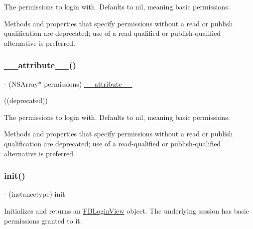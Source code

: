 The permissions to login with. Defaults to nil, meaning basic permissions.

Methods and properties that specify permissions without a read or publish qualification are deprecated; use of a read-\/qualified or publish-\/qualified alternative is preferred. \mbox{\label{interfaceFBLoginView_aed5ee6aec67e5fd04eed62c4ff09b9f4}} 
\subsubsection{\texorpdfstring{\+\_\+\+\_\+attribute\+\_\+\+\_\+()}{\_\_attribute\_\_()}\hspace{0.1cm}{\footnotesize\ttfamily [5/5]}}
{\footnotesize\ttfamily -\/ (N\+S\+Array$\ast$ permissions) \hyperlink{struct____attribute____}{\+\_\+\+\_\+attribute\+\_\+\+\_\+} \begin{DoxyParamCaption}\item[{((deprecated))}]{ }\end{DoxyParamCaption}}

The permissions to login with. Defaults to nil, meaning basic permissions.

Methods and properties that specify permissions without a read or publish qualification are deprecated; use of a read-\/qualified or publish-\/qualified alternative is preferred. \mbox{\label{interfaceFBLoginView_ae0dfdb97b6ddecbd42bb778b02d3f890}} 
\subsubsection{\texorpdfstring{init()}{init()}\hspace{0.1cm}{\footnotesize\ttfamily [1/5]}}
{\footnotesize\ttfamily -\/ (instancetype) init \begin{DoxyParamCaption}{ }\end{DoxyParamCaption}}

Initializes and returns an {\ttfamily \hyperlink{interfaceFBLoginView}{F\+B\+Login\+View}} object. The underlying session has basic permissions granted to it. \mbox{\label{interfaceFBLoginView_ae0dfdb97b6ddecbd42bb778b02d3f890}} 
